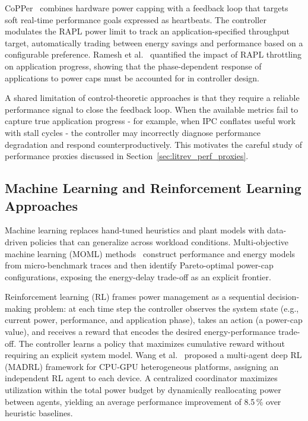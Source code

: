 CoPPer~\cite{CoPPer} combines hardware power capping with a feedback loop
that targets soft real-time performance goals expressed as heartbeats.
The controller modulates the RAPL power limit to track an application-specified
throughput target, automatically trading between energy savings and performance
based on a configurable preference.
Ramesh et al.~\cite{ramesh2019understanding} quantified the impact of RAPL
throttling on application progress, showing that the phase-dependent response
of applications to power caps must be accounted for in controller design.

A shared limitation of control-theoretic approaches is that they require
a reliable performance signal to close the feedback loop.  When the available
metrics fail to capture true application progress - for example, when IPC
conflates useful work with stall cycles - the controller may incorrectly diagnose
performance degradation and respond counterproductively.
This motivates the careful study of performance proxies discussed in
Section~\ref{sec:litrev_perf_proxies}.

\subsection{Machine Learning and Reinforcement Learning Approaches}

Machine learning replaces hand-tuned heuristics and plant models with
data-driven policies that can generalize across workload conditions.
Multi-objective machine learning (MOML) methods~\cite{MOML} construct
performance and energy models from micro-benchmark traces and then identify
Pareto-optimal power-cap configurations, exposing the energy-delay
trade-off as an explicit frontier.

Reinforcement learning (RL) frames power management as a sequential
decision-making problem: at each time step the controller observes the system
state (e.g., current power, performance, and application phase), takes an action
(a power-cap value), and receives a reward that encodes the desired
energy-performance trade-off.  The controller learns a policy that maximizes
cumulative reward without requiring an explicit system model.
Wang et al.~\cite{10.1145/3716872} proposed a multi-agent deep RL (MADRL)
framework for CPU-GPU heterogeneous platforms, assigning an independent RL agent
to each device.  A centralized coordinator maximizes utilization within the total
power budget by dynamically reallocating power between agents, yielding an
average performance improvement of 8.5\,\% over heuristic baselines.

